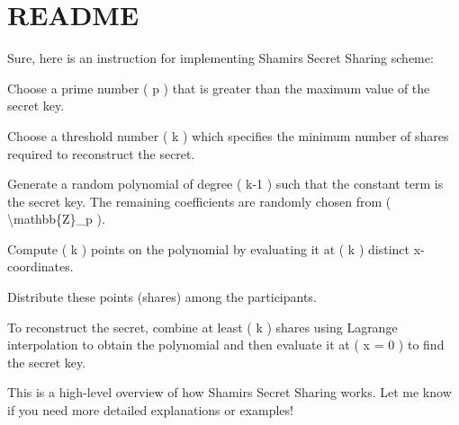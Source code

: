 \chapter{README}
\hypertarget{md__r_e_a_d_m_e}{}\label{md__r_e_a_d_m_e}
Sure, here is an instruction for implementing Shamir\textquotesingle{}s Secret Sharing scheme\+:


\begin{DoxyEnumerate}
\item Choose a prime number ( p ) that is greater than the maximum value of the secret key.
\item Choose a threshold number ( k ) which specifies the minimum number of shares required to reconstruct the secret.
\item Generate a random polynomial of degree ( k-\/1 ) such that the constant term is the secret key. The remaining coefficients are randomly chosen from ( \textbackslash{}mathbb\{Z\}\+\_\+p ).
\item Compute ( k ) points on the polynomial by evaluating it at ( k ) distinct x-\/coordinates.
\item Distribute these points (shares) among the participants.
\item To reconstruct the secret, combine at least ( k ) shares using Lagrange interpolation to obtain the polynomial and then evaluate it at ( x = 0 ) to find the secret key.
\end{DoxyEnumerate}

This is a high-\/level overview of how Shamir\textquotesingle{}s Secret Sharing works. Let me know if you need more detailed explanations or examples! 